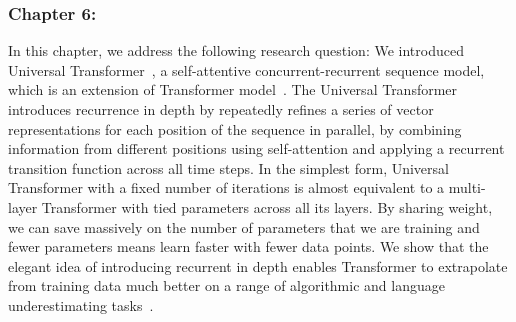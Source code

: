 \subsubsection*{Chapter 6: }
In this chapter, we address the following research question:
We introduced Universal Transformer~\citep{Dehghani:ICLR:2019}, a self-attentive concurrent-recurrent sequence model, which is an extension of Transformer model~\citep{vaswani2017attention}. The Universal Transformer introduces recurrence in depth by repeatedly refines a series of vector representations for each position of the sequence in parallel, by combining information from different positions using self-attention and applying a recurrent transition function across all time steps. 
In the simplest form, Universal Transformer with a fixed number of iterations is almost equivalent to a multi-layer Transformer with tied parameters across all its layers. By sharing weight, we can save massively on the number of parameters that we are training and fewer parameters means learn faster with fewer data points.  We show that the elegant idea of introducing recurrent in depth enables Transformer to extrapolate from training data much better on a range of algorithmic and language underestimating tasks~\citep{Dehghani:ICLR:2019, Dehghani:2019:WSDM}.


